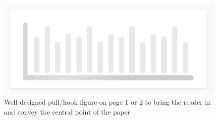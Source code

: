 






\begin{figure}[h]
  \centering
  \begin{minipage}{0.55\linewidth}
      \centering
      \includegraphics[width=\linewidth]{assets/chart_placeholder.png}
  \end{minipage}
\caption{Well-designed pull/hook figure on page 1 or 2 to bring the reader in and convey the central point of the paper}
\label{fig:hook_figure}
\end{figure}

